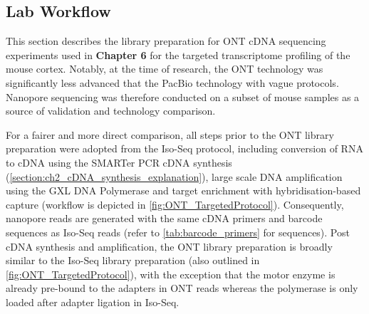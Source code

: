 \clearpage
\subsection{Lab Workflow}
\label{chap:ont_labpipeline}
This section describes the library preparation for ONT cDNA sequencing experiments used in \textbf{Chapter 6} for the targeted transcriptome profiling of the mouse cortex. Notably, at the time of research, the ONT technology was significantly less advanced that the PacBio technology with vague protocols. Nanopore sequencing was therefore conducted on a subset of mouse samples as a source of validation and technology comparison. 

For a fairer and more direct comparison, all steps prior to the ONT library preparation were adopted from the Iso-Seq protocol, including conversion of RNA to cDNA using the SMARTer PCR cDNA synthesis (\cref{section:ch2_cDNA_synthesis_explanation}), large scale DNA amplification using the GXL DNA Polymerase and target enrichment with hybridisation-based capture (workflow is depicted in \cref{fig:ONT_TargetedProtocol}). Consequently, nanopore reads are generated with the same cDNA primers and barcode sequences as Iso-Seq reads (refer to \cref{tab:barcode_primers} for sequences). Post cDNA synthesis and amplification, the ONT library preparation is broadly similar to the Iso-Seq library preparation (also outlined in \cref{fig:ONT_TargetedProtocol}), with the exception that the motor enzyme is already pre-bound to the adapters in ONT reads whereas the polymerase is only loaded after adapter ligation in Iso-Seq.  

